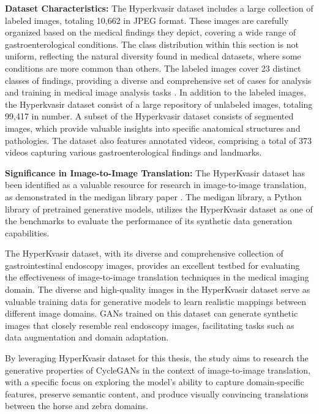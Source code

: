 \documentclass[UKenglish,12pt]{master-style}
\begin{document}
\textbf{Dataset Characteristics:} The Hyperkvasir dataset includes a large collection of labeled images, totaling 10,662 in JPEG format. These images are carefully organized based on the medical findings they depict, covering a wide range of gastroenterological conditions. The class distribution within this section is not uniform, reflecting the natural diversity found in medical datasets, where some conditions are more common than others. The labeled images cover 23 distinct classes of findings, providing a diverse and comprehensive set of cases for analysis and training in medical image analysis tasks \cite{HyperKvasir_Dataset}. In addition to the labeled images, the Hyperkvasir dataset consist of a large repository of unlabeled images, totaling 99,417 in number. A subset of the Hyperkvasir dataset consists of segmented images, which provide valuable insights into specific anatomical structures and pathologies. The dataset also features annotated videos, comprising a total of 373 videos capturing various gastroenterological findings and landmarks. 

\textbf{Significance in Image-to-Image Translation: } The HyperKvasir dataset has been identified as a valuable resource for research in image-to-image translation, as demonstrated in the medigan library paper \cite{medigan}.  The medigan library, a Python library of pretrained generative models, utilizes the HyperKvasir dataset as one of the benchmarks to evaluate the performance of its synthetic data generation capabilities. 

The HyperKvasir dataset, with its diverse and comprehensive collection of gastrointestinal endoscopy images, provides an excellent testbed for evaluating the effectiveness of image-to-image translation techniques in the medical imaging domain. The diverse and high-quality images in the HyperKvasir dataset serve as valuable training data for generative models to learn realistic mappings between different image domains. GANs trained on this dataset can generate synthetic images that closely resemble real endoscopy images, facilitating tasks such as data augmentation and domain adaptation.

By leveraging HyperKvasir dataset for this thesis, the study aims to research the generative properties of CycleGANs in the context of image-to-image translation, with a specific focus on exploring the model's ability to capture domain-specific features, preserve semantic content, and produce visually convincing translations between the horse and zebra domains.
\end{document}
